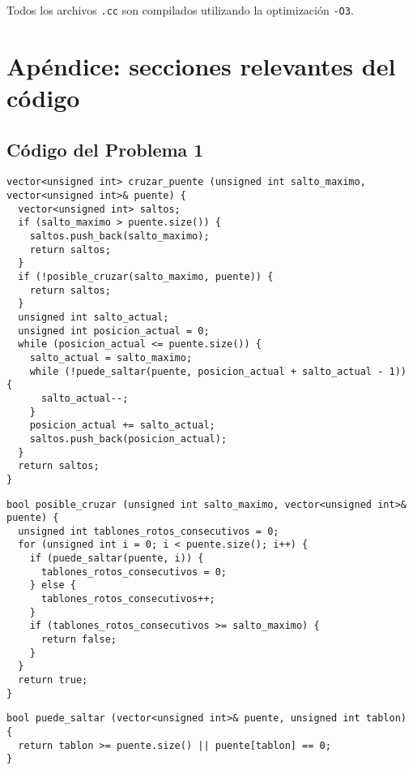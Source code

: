 \documentclass[a4paper]{article}
\begin{document}
Todos los archivos \verb|.cc| son compilados utilizando la optimización \verb|-O3|.   

\newpage

\section{Apéndice: secciones relevantes del código}

\subsection{Código del Problema 1}



\begin{lstlisting}
vector<unsigned int> cruzar_puente (unsigned int salto_maximo, vector<unsigned int>& puente) {
  vector<unsigned int> saltos;
  if (salto_maximo > puente.size()) {
    saltos.push_back(salto_maximo);
    return saltos;
  }
  if (!posible_cruzar(salto_maximo, puente)) {
    return saltos;
  }
  unsigned int salto_actual;
  unsigned int posicion_actual = 0;
  while (posicion_actual <= puente.size()) {
    salto_actual = salto_maximo;
    while (!puede_saltar(puente, posicion_actual + salto_actual - 1)) {
      salto_actual--;
    }
    posicion_actual += salto_actual;
    saltos.push_back(posicion_actual);
  }
  return saltos;
}
\end{lstlisting} 

\vspace*{0.5cm}

\begin{lstlisting}
bool posible_cruzar (unsigned int salto_maximo, vector<unsigned int>& puente) {
  unsigned int tablones_rotos_consecutivos = 0;
  for (unsigned int i = 0; i < puente.size(); i++) {
    if (puede_saltar(puente, i)) {
      tablones_rotos_consecutivos = 0;
    } else {
      tablones_rotos_consecutivos++;
    }
    if (tablones_rotos_consecutivos >= salto_maximo) {
      return false;
    }
  }
  return true;
}
\end{lstlisting}

\vspace*{0.5cm}

\begin{lstlisting}
bool puede_saltar (vector<unsigned int>& puente, unsigned int tablon) {
  return tablon >= puente.size() || puente[tablon] == 0;
}
\end{lstlisting}

\newpage
\end{document}
